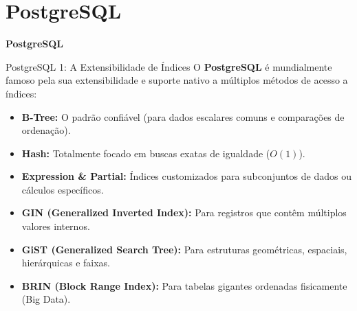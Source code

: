 \documentclass[9pt]{beamer}
\begin{document}
\section{PostgreSQL}

\begin{frame}
    \centering
    \vspace{1cm}
    {\Huge \textbf{PostgreSQL}} \\
    \vspace{0.5cm}
\end{frame}

\begin{frame}{PostgreSQL 1: A Extensibilidade de Índices}
    O \textbf{PostgreSQL} é mundialmente famoso pela sua extensibilidade e suporte nativo a múltiplos métodos de acesso a índices:
    
    \vspace{0.3cm}
    \begin{itemize}
        \item \textbf{B-Tree:} O padrão confiável (para dados escalares comuns e comparações de ordenação).
        \item \textbf{Hash:} Totalmente focado em buscas exatas de igualdade ($O(1)$).
        \item \textbf{Expression \& Partial:} Índices customizados para subconjuntos de dados ou cálculos específicos.
        \item \textbf{GIN (Generalized Inverted Index):} Para registros que contêm múltiplos valores internos.
        \item \textbf{GiST (Generalized Search Tree):} Para estruturas geométricas, espaciais, hierárquicas e faixas.
        \item \textbf{BRIN (Block Range Index):} Para tabelas gigantes ordenadas fisicamente (Big Data).
    \end{itemize}
\end{frame}
\end{document}
